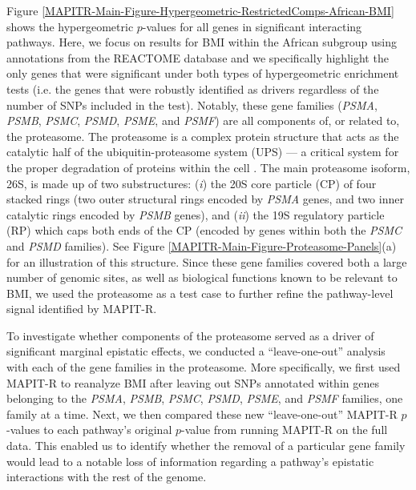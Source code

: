 \documentclass[10pt]{article}
\begin{document}
Figure \ref{MAPITR-Main-Figure-Hypergeometric-RestrictedComps-African-BMI} shows the hypergeometric $p$-values for all genes in significant interacting pathways. Here, we focus on results for BMI within the African subgroup using annotations from the REACTOME database and we specifically highlight the only genes that were significant under both types of hypergeometric enrichment tests (i.e. the genes that were robustly identified as drivers regardless of the number of SNPs included in the test). Notably, these gene families (\textit{PSMA}, \textit{PSMB}, \textit{PSMC}, \textit{PSMD}, \textit{PSME}, and \textit{PSMF}) are all components of, or related to, the proteasome. The proteasome is a complex protein structure that acts as the catalytic half of the ubiquitin-proteasome system (UPS) --- a critical system for the proper degradation of proteins within the cell \cite{Voges1999,Livneh2016,Collins2017}. The main proteasome isoform, 26S, is made up of two substructures: (\textit{i}) the 20S core particle (CP) of four stacked rings (two outer structural rings encoded by \textit{PSMA} genes, and two inner catalytic rings encoded by \textit{PSMB} genes), and (\textit{ii}) the 19S regulatory particle (RP) which caps both ends of the CP (encoded by genes within both the \textit{PSMC} and \textit{PSMD} families). See Figure \ref{MAPITR-Main-Figure-Proteasome-Panels}(a) for an illustration of this structure. Since these gene families covered both a large number of genomic sites, as well as biological functions known to be relevant to BMI, we used the proteasome as a test case to further refine the pathway-level signal identified by MAPIT-R.
 
To investigate whether components of the proteasome served as a driver of significant marginal epistatic effects, we conducted a ``leave-one-out'' analysis with each of the gene families in the proteasome. More specifically, we first used MAPIT-R to reanalyze BMI after leaving out SNPs annotated within genes belonging to the \textit{PSMA}, \textit{PSMB}, \textit{PSMC}, \textit{PSMD}, \textit{PSME}, and \textit{PSMF} families, one family at a time. Next, we then compared these new ``leave-one-out'' MAPIT-R $p$-values to each pathway's original $p$-value from running MAPIT-R on the full data. This enabled us to identify whether the removal of a particular gene family would lead to a notable loss of information regarding a pathway's epistatic interactions with the rest of the genome. 
 
\end{document}
